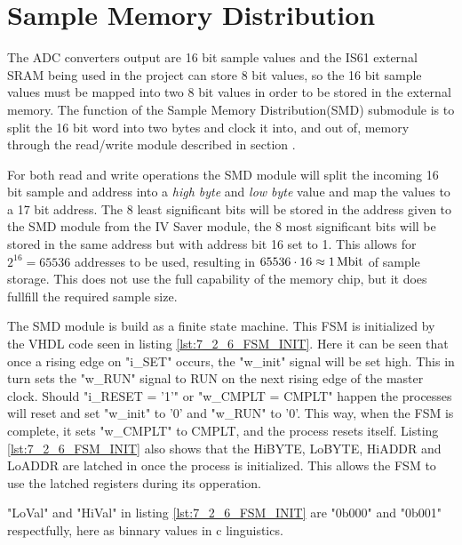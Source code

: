\section{Sample Memory Distribution} \label{subsec:Sample_Memory_Distribution} 
The ADC converters output are 16 bit sample values and the IS61 external SRAM being used in the project can store 8 bit values, so the 16 bit sample values must be mapped into two 8 bit values in order to be stored in the external memory. The function of the Sample Memory Distribution(SMD) submodule is to split the 16 bit word into two bytes and clock it into, and out of, memory through the read/write module described in section .

For both read and write operations the SMD module will split the incoming 16 bit sample and address into a \textit{high byte} and \textit{low byte} value and map the values to a 17 bit address. The 8 least significant bits will be stored in the address given to the SMD module from the IV Saver module, the 8 most significant bits will be stored in the same address but with address bit 16 set to 1. This allows for $2^{16} = 65536$ addresses to be used, resulting in $65536\cdot16 \approx \SIQ{1}{\mega\bit}$ of sample storage. This does not use the full capability of the memory chip, but it does fullfill the required sample size. 

The SMD module is build as a finite state machine. This FSM is initialized by the VHDL code seen in listing \ref{lst:7_2_6_FSM_INIT}. Here it can be seen that once a rising edge on "i\_SET" occurs, the "w\_init" signal will be set high. This in turn sets the "w\_RUN" signal to RUN on the next rising edge of the  master clock. Should "i\_RESET = '1'" or "w\_CMPLT = CMPLT" happen the processes will reset and set "w\_init" to '0' and "w\_RUN" to '0'. This way, when the FSM is complete, it sets "w\_CMPLT" to CMPLT, and the process resets itself. Listing \ref{lst:7_2_6_FSM_INIT} also shows that the HiBYTE, LoBYTE, HiADDR and LoADDR are latched in once the process is initialized. This allows the FSM to use the latched registers during its opperation. 

"LoVal" and "HiVal" in listing \ref{lst:7_2_6_FSM_INIT} are "0b000" and "0b001" respectfully, here as binnary values in c linguistics.

 

